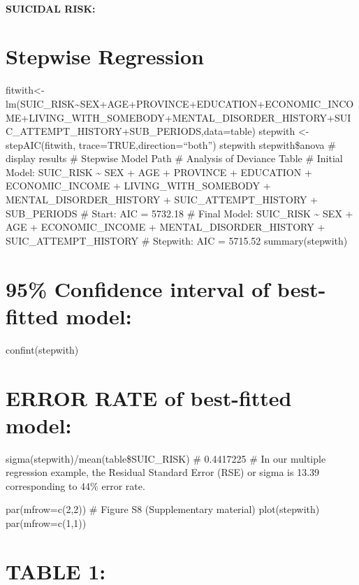 \documentclass[
]{book}
\begin{document}
\hypertarget{suicidal-risk-2}{%
\subsubsection{SUICIDAL RISK:}\label{suicidal-risk-2}}

\hypertarget{stepwise-regression-3}{%
\chapter{Stepwise Regression}\label{stepwise-regression-3}}

fitwith\textless-lm(SUIC\_RISK\textasciitilde SEX+AGE+PROVINCE+EDUCATION+ECONOMIC\_INCOME+LIVING\_WITH\_SOMEBODY+MENTAL\_DISORDER\_HISTORY+SUIC\_ATTEMPT\_HISTORY+SUB\_PERIODS,data=table)
stepwith \textless- stepAIC(fitwith, trace=TRUE,direction=``both'')
stepwith
stepwith\$anova \# display results
\# Stepwise Model Path
\# Analysis of Deviance Table
\# Initial Model: SUIC\_RISK \textasciitilde{} SEX + AGE + PROVINCE + EDUCATION + ECONOMIC\_INCOME + LIVING\_WITH\_SOMEBODY + MENTAL\_DISORDER\_HISTORY + SUIC\_ATTEMPT\_HISTORY + SUB\_PERIODS
\# Start: AIC = 5732.18
\# Final Model: SUIC\_RISK \textasciitilde{} SEX + AGE + ECONOMIC\_INCOME + MENTAL\_DISORDER\_HISTORY + SUIC\_ATTEMPT\_HISTORY
\# Stepwith: AIC = 5715.52
summary(stepwith)

\hypertarget{confidence-interval-of-best-fitted-model-3}{%
\chapter{95\% Confidence interval of best-fitted model:}\label{confidence-interval-of-best-fitted-model-3}}

confint(stepwith)

\hypertarget{error-rate-of-best-fitted-model-3}{%
\chapter{ERROR RATE of best-fitted model:}\label{error-rate-of-best-fitted-model-3}}

sigma(stepwith)/mean(table\$SUIC\_RISK)
\# 0.4417225
\# In our multiple regression example, the Residual Standard Error (RSE) or sigma is 13.39 corresponding to 44\% error rate.

par(mfrow=c(2,2))
\# Figure S8 (Supplementary material)
plot(stepwith)
par(mfrow=c(1,1))

\hypertarget{table-1-3}{%
\chapter{TABLE 1:}\label{table-1-3}}
\end{document}
